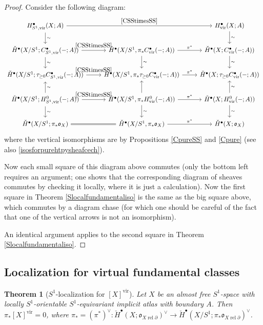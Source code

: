 \documentclass[12pt]{article}
\newtheorem{theorem}{Theorem}[subsection]
\theoremstyle{definition}
\theoremstyle{remark}
\numberwithin{equation}{subsection}
\newcommand{\oo}{\mathfrak o}
\newcommand{\cH}{\check H}
\newcommand{\vir}{\mathrm{vir}}
\newcommand{\rel}{\operatorname{rel}}
\begin{document}
\begin{proof}
Consider the following diagram:
\begin{equation*}%
\begin{tikzcd}
H^\bullet_{S^1,\vir}(X;A)\ar{d}{\sim}\ar{rr}{\eqref{CSStimesSS}}&&H^\bullet_\vir(X;A)\ar{d}{\sim}\\
\cH^\bullet(X/S^1;C^\bullet_{S^1,\vir}(-;A))\ar{r}{\eqref{CSStimesSS}}\ar{d}{\sim}&\cH^\bullet(X/S^1,\pi_\ast C^\bullet_\vir(-;A))\ar{r}{\pi^\ast}\ar{d}{\sim}&\cH^\bullet(X;C^\bullet_\vir(-;A))\ar{d}{\sim}\\
\cH^\bullet(X/S^1;\tau_{\geq 0}C^\bullet_{S^1,\vir}(-;A))\ar{r}{\eqref{CSStimesSS}}&\cH^\bullet(X/S^1,\pi_\ast\tau_{\geq 0}C^\bullet_\vir(-;A))\ar{r}{\pi^\ast}&\cH^\bullet(X;\tau_{\geq 0}C^\bullet_\vir(-;A))\\
\cH^\bullet(X/S^1;H^0_{S^1,\vir}(-;A))\ar{u}[swap]{\sim}\ar{r}{\eqref{CSStimesSS}}\ar{d}{\sim}&\cH^\bullet(X/S^1,\pi_\ast H^0_\vir(-;A))\ar{r}{\pi^\ast}\ar{u}\ar{d}{\sim}&\cH^\bullet(X;H^0_\vir(-;A))\ar{u}[swap]{\sim}\ar{d}{\sim}\\
\cH^\bullet(X/S^1;\pi_\ast\oo_X)\ar[equal]{r}&\cH^\bullet(X/S^1,\pi_\ast\oo_X)\ar{r}{\pi^\ast}&\cH^\bullet(X;\oo_X)
\end{tikzcd}
\end{equation*}
where the vertical isomorphisms are by Propositions \ref{CpureSS} and \ref{Cpure} (see also \eqref{isosforpurehtpysheafcech}).

Now each small square of this diagram above commutes (only the bottom left requires an argument; one shows that the corresponding diagram of sheaves commutes by checking it locally, where it is just a calculation).  Now the first square in Theorem \ref{Slocalfundamentaliso} is the same as the big square above, which commutes by a diagram chase (for which one should be careful of the fact that one of the vertical arrows is not an isomorphism).

An identical argument applies to the second square in Theorem \ref{Slocalfundamentaliso}.
\end{proof}

\subsection{Localization for virtual fundamental classes}\label{fclocalizationsection}

\begin{theorem}[{$S^1$-localization for $[X]^\vir$}]\label{fclocalization}
Let $X$ be an almost free $S^1$-space with locally $S^1$-orientable $S^1$-equivariant implicit atlas with boundary $A$.  Then $\pi_\ast[X]^\vir=0$, where $\pi_\ast=(\pi^\ast)^\vee:\cH^\bullet(X;\oo_{X\rel\partial})^\vee\to\cH^\bullet(X/S^1;\pi_\ast\oo_{X\rel\partial})^\vee$.
\end{theorem}
\end{document}
